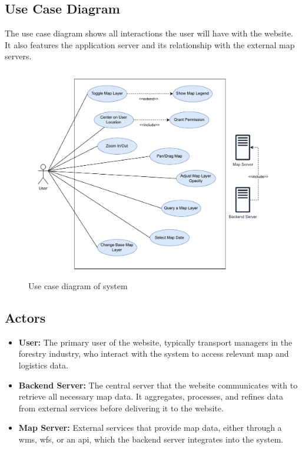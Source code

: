 \subsection{Use Case Diagram}
The use case diagram shows all interactions the user will have with the website. It also features the application server and its relationship with the external map servers.
\begin{figure}[h]
    \centering
    \includegraphics[width=1\linewidth]{figures/use_case_diagram.pdf}
    \caption{Use case diagram of system}
    \label{fig:use_case_diagram}
\end{figure}

\subsection{Actors}

\begin{itemize}
    \item \textbf{User:} The primary user of the website, typically transport managers in the forestry industry, who interact with the system to access relevant map and logistics data.
    \item \textbf{Backend Server:} The central server that the website communicates with to retrieve all necessary map data. It aggregates, processes, and refines data from external services before delivering it to the website.
    \item \textbf{Map Server:} External services that provide map data, either through a \Gls{wms}, \Gls{wfs}, or an \acrshort{api}, which the backend server integrates into the system.
\end{itemize}

